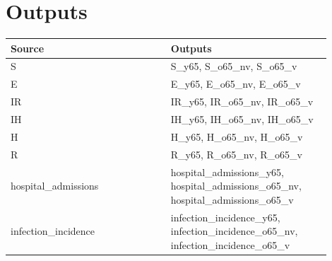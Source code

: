 \documentclass{article}
\begin{document}
\section*{Outputs}
\begin{longtable}{p{0.45\linewidth}p{0.45\linewidth}}
Source & Outputs \\
\hline
\endhead
S & S\_y65, S\_o65\_nv, S\_o65\_v \\
E & E\_y65, E\_o65\_nv, E\_o65\_v \\
IR & IR\_y65, IR\_o65\_nv, IR\_o65\_v \\
IH & IH\_y65, IH\_o65\_nv, IH\_o65\_v \\
H & H\_y65, H\_o65\_nv, H\_o65\_v \\
R & R\_y65, R\_o65\_nv, R\_o65\_v \\
hospital\_admissions & hospital\_admissions\_y65, hospital\_admissions\_o65\_nv, hospital\_admissions\_o65\_v \\
infection\_incidence & infection\_incidence\_y65, infection\_incidence\_o65\_nv, infection\_incidence\_o65\_v \\
\end{longtable}
\end{document}
